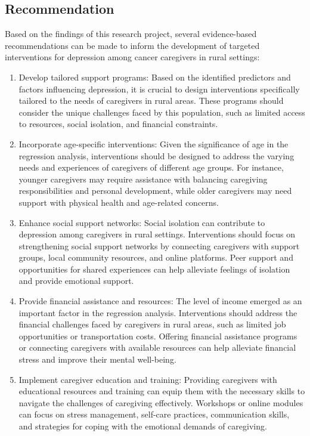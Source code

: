 \documentclass[12pt]{article}
\begin{document}
	\subsection{Recommendation}
	Based on the findings of this research project, several evidence-based recommendations can be made to inform the development of targeted interventions for depression among cancer caregivers in rural settings:\\
	\begin{enumerate}
		\item Develop tailored support programs: Based on the identified predictors and factors influencing depression, it is crucial to design interventions specifically tailored to the needs of caregivers in rural areas. These programs should consider the unique challenges faced by this population, such as limited access to resources, social isolation, and financial constraints.\\
		
		\item Incorporate age-specific interventions: Given the significance of age in the regression analysis, interventions should be designed to address the varying needs and experiences of caregivers of different age groups. For instance, younger caregivers may require assistance with balancing caregiving responsibilities and personal development, while older caregivers may need support with physical health and age-related concerns.\\
		
		\item Enhance social support networks: Social isolation can contribute to depression among caregivers in rural settings. Interventions should focus on strengthening social support networks by connecting caregivers with support groups, local community resources, and online platforms. Peer support and opportunities for shared experiences can help alleviate feelings of isolation and provide emotional support.\\  
		
		\item Provide financial assistance and resources: The level of income emerged as an important factor in the regression analysis. Interventions should address the financial challenges faced by caregivers in rural areas, such as limited job opportunities or transportation costs. Offering financial assistance programs or connecting caregivers with available resources can help alleviate financial stress and improve their mental well-being.\\
		
		\item Implement caregiver education and training: Providing caregivers with educational resources and training can equip them with the necessary skills to navigate the challenges of caregiving effectively. Workshops or online modules can focus on stress management, self-care practices, communication skills, and strategies for coping with the emotional demands of caregiving.\\
		
	
	\end{enumerate}
	
	
\end{document}
